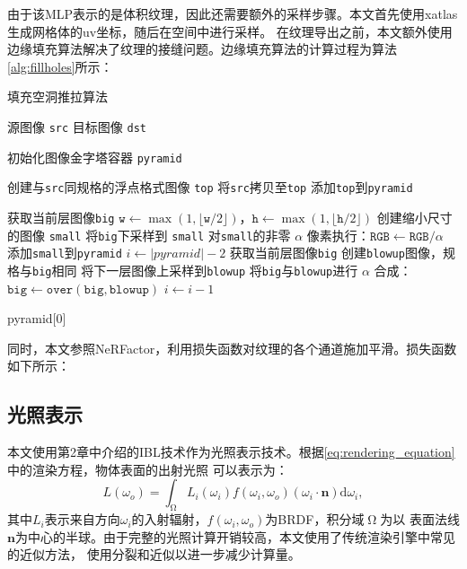 由于该MLP表示的是体积纹理，因此还需要额外的采样步骤。本文首先使用xatlas生成网格体的uv坐标，随后在空间中进行采样。
在纹理导出之前，本文额外使用边缘填充算法解决了纹理的接缝问题。边缘填充算法的计算过程为算法\ref{alg:fillholes}所示：

\renewcommand{\algorithmicrequire}{\textbf{输入：}\unskip}
\renewcommand{\algorithmicensure}{\textbf{输出：}\unskip}

\begin{algorithm}
  \caption{填充空洞推拉算法}
  \label{alg:fillholes}
  \small
  \begin{algorithmic}[1]
  \REQUIRE 源图像 \texttt{src}
  \ENSURE 目标图像 \texttt{dst}
  
  \STATE 初始化图像金字塔容器 \texttt{pyramid}
  
  \STATE 创建与\texttt{src}同规格的浮点格式图像 \texttt{top}
  \STATE 将\texttt{src}拷贝至\texttt{top}
  \STATE 添加\texttt{top}到\texttt{pyramid}
  
      \STATE 获取当前层图像\texttt{big}
      \STATE $\texttt{w} \gets \max(1, \lfloor \texttt{w}/2 \rfloor)$，$\texttt{h} \gets \max(1, \lfloor \texttt{h}/2 \rfloor)$
      \STATE 创建缩小尺寸的图像 \texttt{small}
      \STATE 将\texttt{big}下采样到 \texttt{small}
      \STATE 对\texttt{small}的非零 $\alpha$ 像素执行：$\texttt{RGB} \gets \texttt{RGB} / \alpha$
      \STATE 添加\texttt{small}到\texttt{pyramid}
  \ENDWHILE
  \STATE $i \gets |pyramid| - 2$
      \STATE 获取当前层图像\texttt{big}
      \STATE 创建\texttt{blowup}图像，规格与\texttt{big}相同
      \STATE 将下一层图像上采样到\texttt{blowup}
      \STATE 将\texttt{big}与\texttt{blowup}进行 $\alpha$ 合成：$\texttt{big} \gets \texttt{over}(\texttt{big}, \texttt{blowup})$
      \STATE $i \gets i - 1$
  \ENDWHILE

  \RETURN pyramid[0]
  \end{algorithmic}
  \end{algorithm}

同时，本文参照NeRFactor\cite{zhang2021nerfactor}，利用损失函数对纹理的各个通道施加平滑。损失函数如下所示：

\subsection{光照表示}
本文使用第2章中介绍的IBL技术作为光照表示技术。根据\eqref{eq:rendering_equation}中的渲染方程，物体表面的出射光照
可以表示为：
\begin{equation}
  \label{eq:radiance}
  L\left(\omega_o\right)=\int_{\upOmega} L_i\left(\omega_i\right)f\left(\omega_i,\omega_o\right)\left(\omega_i\cdot\mathbf{n}\right)\mathrm{d}\omega_i,
\end{equation}
其中$L_i$表示来自方向$\omega_i$的入射辐射，$f\left(\omega_i,\omega_o\right)$为BRDF，积分域$\upOmega$为以
表面法线$\mathbf{n}$为中心的半球。由于完整的光照计算开销较高，本文使用了传统渲染引擎中常见的近似方法\cite{Hill_2014}，
使用分裂和近似以进一步减少计算量。

